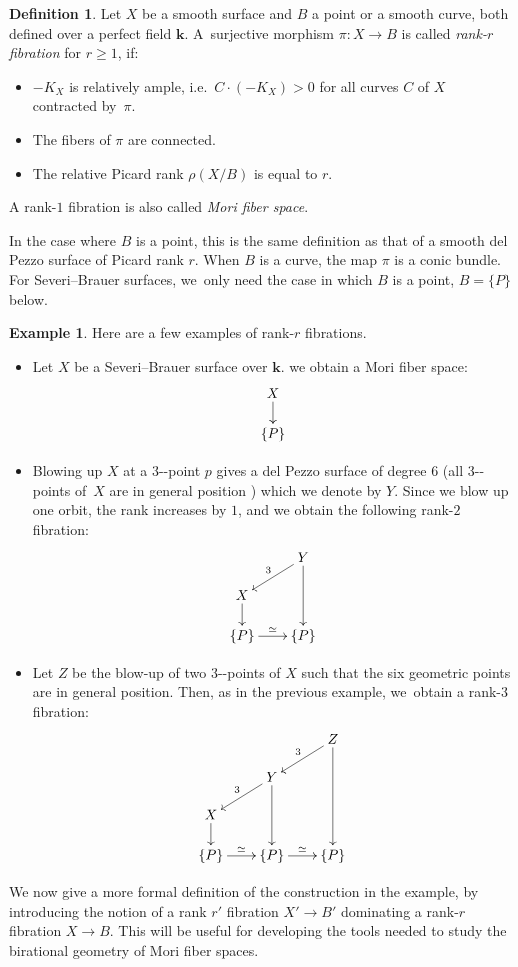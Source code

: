 \documentclass[10pt,a4paper]{amsart}
\newcommand{\ie}{i.e.\ }
\providecommand{\nobreakdash}{\nobreak\hbox{-}}
\theoremstyle{definition}
\newtheorem{definition}[theorem]{Definition}
\newtheorem{example}[theorem]{Example}
\newcommand{\kk}{{\boldsymbol{k}}}
\begin{document}
\begin{definition} \label{RankRFibration}
Let $X$ be a smooth surface and $B$ a point or a smooth curve, both defined over a perfect field $\kk$. A~surjective morphism $\pi\colon X \to B$ is called \emph{rank-$r$ fibration} for $r \geq 1$, if:
\begin{itemize}
\item $-K_X$ is relatively ample, \ie $C\!\cdot\! (-K_X) \!>\! 0$ for all curves $C$ of $X$ contracted by~$\pi$.
\item The fibers of $\pi$ are connected.
\item The relative Picard rank $\rho(X/B)$ is equal to $r$.
\end{itemize}
A rank-$1$ fibration is also called \emph{Mori fiber space}.
\end{definition}
In the case where $B$ is a point, this is the same definition as that of a smooth del Pezzo surface of Picard rank $r$. When $B$ is a curve, the map $\pi$ is a conic bundle. For Severi--Brauer surfaces, we~only need the case in which $B$ is a point, $B = \{P\}$ below.

\begin{example} Here are a few examples of rank-$r$ fibrations.
\begin{itemize}
\item Let $X$ be a Severi--Brauer surface over $\kk$. we obtain a Mori fiber space:
\[
\xymatrix@R=.5cm{ X \ar[d] \\ \{P \} }
\]

\item Blowing up $X$ at a $3$\nobreakdash-point $p$ gives a del Pezzo surface of degree $6$ (all $3$\nobreakdash-points of~$X$ are in general position \cite[Lem.\,2.8]{zbMATH07206468}) which we denote by $Y$. Since we blow up one orbit, the rank increases by $1$, and we obtain the following rank-$2$ fibration:
\[
\xymatrix@C=.7cm@R=.5cm{& Y \ar[dl]_3 \ar[dd] \\ X \ar[d] & \\ \{P \} \ar[r]^{\simeq} & \{P\} }
\]

\item Let $Z$ be the blow-up of two $3$\nobreakdash-points of $X$ such that the six geometric points are in general position. Then, as in the previous example, we~obtain a rank-$3$ fibration:
\[
\xymatrix@C=.7cm@R=.5cm{&&Z \ar[ddd] \ar[dl]_3\\& Y \ar[dl]_3 \ar[dd] & \\ X \ar[d] & & \\ \{P \} \ar[r]^{\simeq} & \{P\} \ar[r]^{\simeq} & \{P\} }
\]
\end{itemize}
\end{example}
We now give a more formal definition of the construction in the example, by introducing the notion of a rank $r'$ fibration $X' \to B'$ dominating a rank-$r$ fibration $X \to B$. This will be useful for developing the tools needed to study the birational geometry of Mori fiber spaces.
\end{document}
